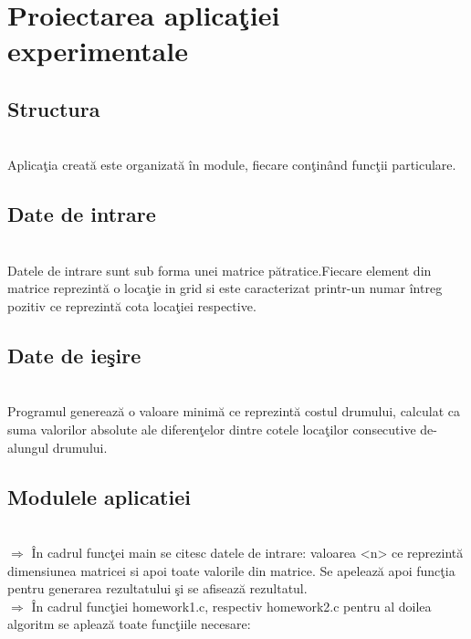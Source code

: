 \documentclass{article}
\begin{document}
\section{Proiectarea aplica\c{t}iei experimentale}
\subsection{Structura}
\\Aplica\c{t}ia creat\u{a} este organizat\u{a} \^{i}n module, fiecare con\c{t}in\^{a}nd func\c{t}ii particulare.

\subsection{Date de intrare}
\\Datele de intrare sunt sub forma unei matrice p\u{a}tratice.Fiecare element din matrice reprezint\u{a} o loca\c{t}ie in grid si este caracterizat printr-un numar \^{i}ntreg pozitiv ce reprezint\u{a} cota loca\c{t}iei respective.
\subsection{Date de ie\c{s}ire}
\\Programul genereaz\u{a} o valoare minim\u{a} ce reprezint\u{a} costul drumului, calculat ca suma valorilor absolute ale diferen\c{t}elor dintre cotele loca\c{t}ilor consecutive de-alungul drumului.
\subsection{Modulele aplicatiei}
\\ $\Rightarrow$ \^{I}n cadrul func\c{t}ei main se citesc datele de intrare: valoarea <n> ce reprezint\u{a} dimensiunea matricei si apoi toate valorile din matrice. Se apeleaz\u{a} apoi func\c{t}ia pentru generarea rezultatului \c{s}i se afiseaz\u{a} rezultatul.
\\ $\Rightarrow$
\^{I}n cadrul func\c{t}iei homework1.c, respectiv homework2.c pentru al doilea algoritm se apleaz\u{a} toate func\c{t}iile necesare:
\end{document}
